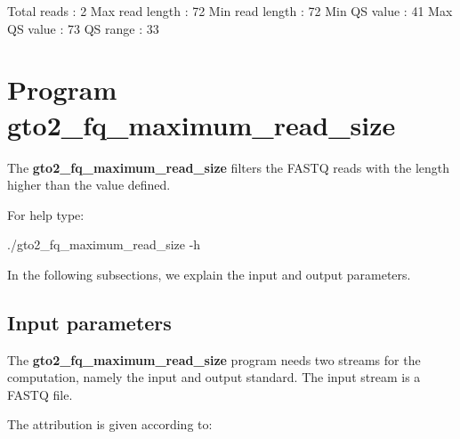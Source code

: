\documentclass[11pt,]{krantz}
\newenvironment{Shaded}{\begin{snugshade}}{\end{snugshade}}
\newcommand{\ExtensionTok}[1]{#1}
\newcommand{\NormalTok}[1]{#1}
\begin{document}
\begin{Shaded}
\begin{Highlighting}[]
\ExtensionTok{Total}\NormalTok{ reads     : 2}
\ExtensionTok{Max}\NormalTok{ read length : 72}
\ExtensionTok{Min}\NormalTok{ read length : 72}
\ExtensionTok{Min}\NormalTok{ QS value    : 41}
\ExtensionTok{Max}\NormalTok{ QS value    : 73}
\ExtensionTok{QS}\NormalTok{ range        : 33}
\end{Highlighting}
\end{Shaded}

\section{Program
gto2\_fq\_maximum\_read\_size}\label{program-gto2_fq_maximum_read_size}

The \textbf{gto2\_fq\_maximum\_read\_size} filters the FASTQ reads with
the length higher than the value defined.

For help type:

\begin{Shaded}
\begin{Highlighting}[]
\ExtensionTok{./gto2_fq_maximum_read_size}\NormalTok{ -h}
\end{Highlighting}
\end{Shaded}

In the following subsections, we explain the input and output
parameters.

\subsection*{Input parameters}\label{input-parameters-5}


The \textbf{gto2\_fq\_maximum\_read\_size} program needs two streams for
the computation, namely the input and output standard. The input stream
is a FASTQ file.

The attribution is given according to:
\end{document}
